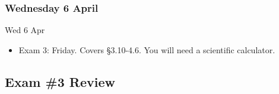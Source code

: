 \documentclass[cal1spr16Lectures.tex]{subfiles}
\begin{document}

\subsubsection{\bf Wednesday 6 April}

\begin{frame}[allowframebreaks]{Wed 6 Apr}
\begin{itemize}%
\item Exam 3: Friday.  Covers \S 3.10-4.6.  You will need a scientific calculator. 
\end{itemize}
\end{frame}

\subsection{Exam \#3 Review}
\end{document}
